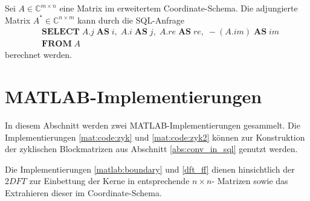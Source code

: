 Sei $A \in \mathbb{C}^{m \times n}$ eine Matrix im erweitertem Coordinate-Schema. Die adjungierte Matrix $A^* \in \mathbb{C}^{n \times m}$ kann durch die SQL-Anfrage
\begin{align*}
    & \mathbf{SELECT} \; A.j \; \mathbf{AS} \; i, \; A.i \; \mathbf{AS} \; j, \; A.re \;\mathbf{AS} \; re, \; -(A.im) \; \mathbf{AS} \; im  \\
    & \mathbf{FROM} \; A
\end{align*}
berechnet werden.
\section{MATLAB-Implementierungen}
\label{app:app_2}

In diesem Abschnitt werden zwei MATLAB-Implementierungen gesammelt. Die Implementierungen \ref{mat:code:zyk} und \ref{mat:code:zyk2} können zur Konstruktion der zyklischen Blockmatrizen aus Abschnitt \ref{abs:conv_in_sql} genutzt werden.



Die Implementierungen \ref{matlab:boundary} und \ref{dft_ff} dienen hinsichtlich der $\mathrm{2}DFT$ zur Einbettung der Kerne in entsprechende $n \times n$- Matrizen sowie das Extrahieren dieser im Coordinate-Schema.



